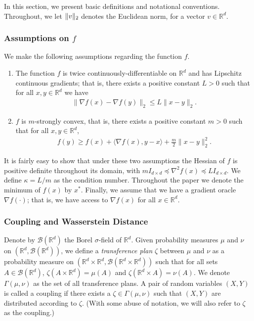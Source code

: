 \label{s:definitions}
In this section, we present basic definitions and notational conventions. Throughout, we let
$\lVert v \rVert_{2}$ denotes the Euclidean norm, for a vector $v \in \mathbb{R}^{d}$. 
\subsubsection{Assumptions on $f$}\label{ss:assumptions}
We make the following assumptions regarding the function $f$.
\begin{enumerate}[label=(A{\arabic*})]
\item The function $f$ is twice continuously-differentiable on $\mathbb{R}^d$ and has Lipschitz continuous gradients; that is, there exists a positive constant $L >0$ such that for all $x,y \in \mathbb{R}^{d}$ we have
\begin{align*}
\lVert \nabla f(x) - \nabla f(y) \rVert_2 \le L \lVert x-y \rVert_2.
\end{align*}
\item $f$ is $m$-strongly convex, that is, there exists a positive constant $m>0$ such that for all $x,y \in \mathbb{R}^d$,
\begin{align*}
f(y) \ge f(x) + \langle \nabla f(x),y-x \rangle + \frac{m}{2} \lVert x-y \rVert_2^2.
\end{align*}
\end{enumerate}
It is fairly easy to show that under these two assumptions the Hessian of $f$ is positive definite throughout its domain, with $m I_{d\times d}  \preceq  \nabla^2 f(x) \preceq L I_{d\times d}$. We define $\kappa = L/m$ as the condition number. Throughout the paper we denote the minimum of $f(x)$ by $x^*$. Finally, we assume that we have a gradient oracle $\nabla f(\cdot)$; that is, we have access to $\nabla f(x)$ for all $x \in \mathbb{R}^d$.
\subsubsection{Coupling and Wasserstein Distance}
Denote by $\mathcal{B}(\mathbb{R}^d)$ the Borel $\sigma$-field of $\mathbb{R}^d$. Given probability measures $\mu$ and $\nu$ on $(\mathbb{R}^d,\mathcal{B}(\mathbb{R}^d))$, we define a \emph{transference plan} $\zeta$ between $\mu$ and $\nu$ as a probability measure on $(\mathbb{R}^d \times \mathbb{R}^d,\mathcal{B}(\mathbb{R}^d\times \mathbb{R}^d))$ such that for all sets $A \in \mathcal{B}(\mathbb{R}^d)$, $\zeta(A\times \mathbb{R}^d) = \mu(A)$ and $\zeta( \mathbb{R}^d \times A) = \nu(A)$. We denote $\Gamma(\mu,\nu)$ as the set of all transference plans. A pair of random variables $(X,Y)$ is called a coupling if there exists a $\zeta \in \Gamma(\mu,\nu)$ such that $(X,Y)$ are distributed according to $\zeta$. (With some abuse of notation, we will also refer to $\zeta$ as the coupling.)

